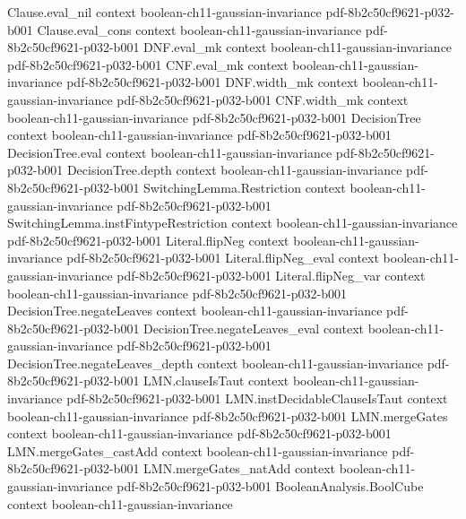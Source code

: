 \begin{lemma}
  {Clause.eval_nil}
  {context}
  {boolean-ch11-gaussian-invariance}
  {pdf-8b2c50cf9621-p032-b001}
\proofstep
  {Clause.eval_cons}
  {context}
  {boolean-ch11-gaussian-invariance}
  {pdf-8b2c50cf9621-p032-b001}
\proofstep
  {DNF.eval_mk}
  {context}
  {boolean-ch11-gaussian-invariance}
  {pdf-8b2c50cf9621-p032-b001}
\proofstep
  {CNF.eval_mk}
  {context}
  {boolean-ch11-gaussian-invariance}
  {pdf-8b2c50cf9621-p032-b001}
\proofstep
  {DNF.width_mk}
  {context}
  {boolean-ch11-gaussian-invariance}
  {pdf-8b2c50cf9621-p032-b001}
\proofstep
  {CNF.width_mk}
  {context}
  {boolean-ch11-gaussian-invariance}
  {pdf-8b2c50cf9621-p032-b001}
\proofstep
  {DecisionTree}
  {context}
  {boolean-ch11-gaussian-invariance}
  {pdf-8b2c50cf9621-p032-b001}
\proofstep
  {DecisionTree.eval}
  {context}
  {boolean-ch11-gaussian-invariance}
  {pdf-8b2c50cf9621-p032-b001}
\proofstep
  {DecisionTree.depth}
  {context}
  {boolean-ch11-gaussian-invariance}
  {pdf-8b2c50cf9621-p032-b001}
\proofstep
  {SwitchingLemma.Restriction}
  {context}
  {boolean-ch11-gaussian-invariance}
  {pdf-8b2c50cf9621-p032-b001}
\proofstep
  {SwitchingLemma.instFintypeRestriction}
  {context}
  {boolean-ch11-gaussian-invariance}
  {pdf-8b2c50cf9621-p032-b001}
\proofstep
  {Literal.flipNeg}
  {context}
  {boolean-ch11-gaussian-invariance}
  {pdf-8b2c50cf9621-p032-b001}
\proofstep
  {Literal.flipNeg_eval}
  {context}
  {boolean-ch11-gaussian-invariance}
  {pdf-8b2c50cf9621-p032-b001}
\proofstep
  {Literal.flipNeg_var}
  {context}
  {boolean-ch11-gaussian-invariance}
  {pdf-8b2c50cf9621-p032-b001}
\proofstep
  {DecisionTree.negateLeaves}
  {context}
  {boolean-ch11-gaussian-invariance}
  {pdf-8b2c50cf9621-p032-b001}
\proofstep
  {DecisionTree.negateLeaves_eval}
  {context}
  {boolean-ch11-gaussian-invariance}
  {pdf-8b2c50cf9621-p032-b001}
\proofstep
  {DecisionTree.negateLeaves_depth}
  {context}
  {boolean-ch11-gaussian-invariance}
  {pdf-8b2c50cf9621-p032-b001}
\proofstep
  {LMN.clauseIsTaut}
  {context}
  {boolean-ch11-gaussian-invariance}
  {pdf-8b2c50cf9621-p032-b001}
\proofstep
  {LMN.instDecidableClauseIsTaut}
  {context}
  {boolean-ch11-gaussian-invariance}
  {pdf-8b2c50cf9621-p032-b001}
\proofstep
  {LMN.mergeGates}
  {context}
  {boolean-ch11-gaussian-invariance}
  {pdf-8b2c50cf9621-p032-b001}
\proofstep
  {LMN.mergeGates_castAdd}
  {context}
  {boolean-ch11-gaussian-invariance}
  {pdf-8b2c50cf9621-p032-b001}
\proofstep
  {LMN.mergeGates_natAdd}
  {context}
  {boolean-ch11-gaussian-invariance}
  {pdf-8b2c50cf9621-p032-b001}
\proofstep
  {BooleanAnalysis.BoolCube}
  {context}
  {boolean-ch11-gaussian-invariance}

\end{lemma}
